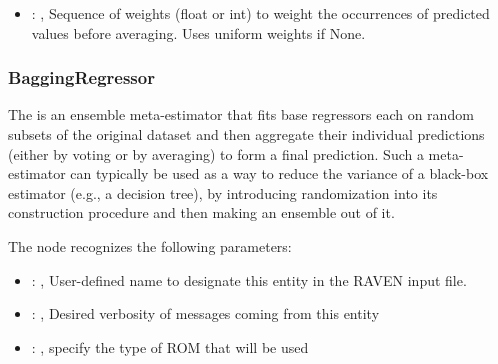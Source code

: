 \begin{itemize}
    \item {}: ,
      Sequence of weights (float or int) to weight the occurrences of predicted
      values before averaging. Uses uniform weights if None.
  \end{itemize}


\subsubsection{BaggingRegressor}
  The  is an ensemble meta-estimator that fits base regressors each on
  random subsets of the original                             dataset and then aggregate their
  individual predictions (either by voting or by averaging) to form a final
  prediction. Such a meta-estimator can typically be used as a way to reduce the variance of a
  black-box estimator                             (e.g., a decision tree), by introducing
  randomization into its construction procedure and then making an ensemble
  out of it.

  The  node recognizes the following parameters:
    \begin{itemize}
      \item {}: ,
        User-defined name to designate this entity in the RAVEN input file.
      \item {}: ,
        Desired verbosity of messages coming from this entity
      \item {}: ,
        specify the type of ROM that will be used
  \end{itemize}

